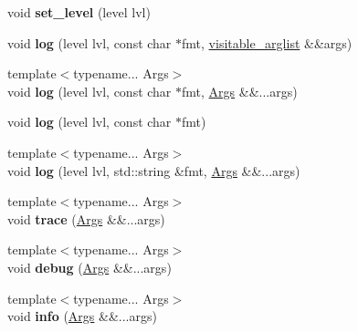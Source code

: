 \begin{DoxyCompactItemize}
\item 
void {\bfseries set\+\_\+level} (level lvl)\hypertarget{classgxx_1_1log_1_1logger_a2fed43a40ddcc2ff88676f7c722fa2fe}{}\label{classgxx_1_1log_1_1logger_a2fed43a40ddcc2ff88676f7c722fa2fe}

\item 
void {\bfseries log} (level lvl, const char $\ast$fmt, \hyperlink{classgxx_1_1visitable__arglist}{visitable\+\_\+arglist} \&\&args)\hypertarget{classgxx_1_1log_1_1logger_aab161ee185ce599ac1aa4e5c016ce62e}{}\label{classgxx_1_1log_1_1logger_aab161ee185ce599ac1aa4e5c016ce62e}

\item 
{\footnotesize template$<$typename... Args$>$ }\\void {\bfseries log} (level lvl, const char $\ast$fmt, \hyperlink{structArgs}{Args} \&\&...args)\hypertarget{classgxx_1_1log_1_1logger_ad2fb8975812306f8645d4695093627e8}{}\label{classgxx_1_1log_1_1logger_ad2fb8975812306f8645d4695093627e8}

\item 
void {\bfseries log} (level lvl, const char $\ast$fmt)\hypertarget{classgxx_1_1log_1_1logger_afbf52f2aa23291ef47f859fe4234af2d}{}\label{classgxx_1_1log_1_1logger_afbf52f2aa23291ef47f859fe4234af2d}

\item 
{\footnotesize template$<$typename... Args$>$ }\\void {\bfseries log} (level lvl, std\+::string \&fmt, \hyperlink{structArgs}{Args} \&\&...args)\hypertarget{classgxx_1_1log_1_1logger_a0271e182b5945500a1dfebca89d00054}{}\label{classgxx_1_1log_1_1logger_a0271e182b5945500a1dfebca89d00054}

\item 
{\footnotesize template$<$typename... Args$>$ }\\void {\bfseries trace} (\hyperlink{structArgs}{Args} \&\&...args)\hypertarget{classgxx_1_1log_1_1logger_aeebee9c69f9707c222800aed638d642a}{}\label{classgxx_1_1log_1_1logger_aeebee9c69f9707c222800aed638d642a}

\item 
{\footnotesize template$<$typename... Args$>$ }\\void {\bfseries debug} (\hyperlink{structArgs}{Args} \&\&...args)\hypertarget{classgxx_1_1log_1_1logger_a58eac8ab985601769e3be5947860967e}{}\label{classgxx_1_1log_1_1logger_a58eac8ab985601769e3be5947860967e}

\item 
{\footnotesize template$<$typename... Args$>$ }\\void {\bfseries info} (\hyperlink{structArgs}{Args} \&\&...args)\hypertarget{classgxx_1_1log_1_1logger_a2f8eb29dcd6db8033d5f92aa47c09ea9}{}\label{classgxx_1_1log_1_1logger_a2f8eb29dcd6db8033d5f92aa47c09ea9}


\end{DoxyCompactItemize}
